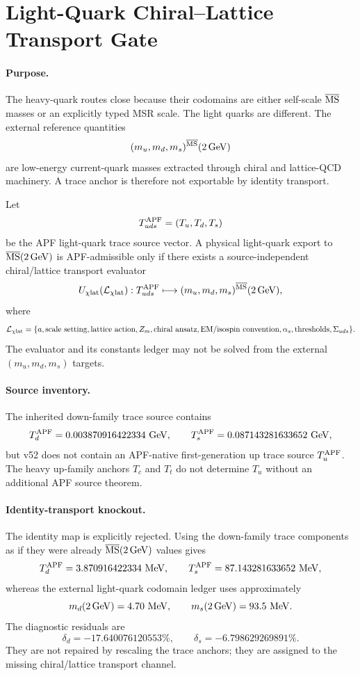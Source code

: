 \section{Light-Quark Chiral--Lattice Transport Gate}
\label{sec:light-quark-chiral-lattice-v52}

\paragraph{Purpose.}
The heavy-quark routes close because their codomains are either self-scale
$\overline{\rm MS}$ masses or an explicitly typed MSR scale.  The light quarks
are different.  The external reference quantities
\[
(m_u,m_d,m_s)^{\overline{\rm MS}}(2\,{\rm GeV})
\]
are low-energy current-quark masses extracted through chiral and lattice-QCD
machinery.  A trace anchor is therefore not exportable by identity transport.

\begin{theorem}
Let
\[
T_{uds}^{\rm APF}=(T_u,T_d,T_s)
\]
be the APF light-quark trace source vector.  A physical light-quark export to
$\overline{\rm MS}(2\,{\rm GeV})$ is APF-admissible only if there exists a
source-independent chiral/lattice transport evaluator
\[
U_{\chi{\rm lat}}(\mathcal L_{\chi{\rm lat}}):
T_{uds}^{\rm APF}\longmapsto
(m_u,m_d,m_s)^{\overline{\rm MS}}(2\,{\rm GeV}),
\]
where
\[
\mathcal L_{\chi{\rm lat}}=
\{a,\text{scale setting},\text{lattice action},Z_m,
\text{chiral ansatz},\text{EM/isospin convention},
\alpha_s,\text{thresholds},\Sigma_{uds}\}.
\]
The evaluator and its constants ledger may not be solved from the external
$(m_u,m_d,m_s)$ targets.
\end{theorem}

\paragraph{Source inventory.}
The inherited down-family trace source contains
\[
T_d^{\rm APF}=0.003870916422334\ {\rm GeV},\qquad
T_s^{\rm APF}=0.087143281633652\ {\rm GeV},
\]
but v52 does not contain an APF-native first-generation up trace source
$T_u^{\rm APF}$.  The heavy up-family anchors $T_c$ and $T_t$ do not determine
$T_u$ without an additional APF source theorem.

\paragraph{Identity-transport knockout.}
The identity map is explicitly rejected.  Using the down-family trace components
as if they were already $\overline{\rm MS}(2\,{\rm GeV})$ values gives
\[
T_d^{\rm APF}=3.870916422334\ {\rm MeV},\qquad
T_s^{\rm APF}=87.143281633652\ {\rm MeV},
\]
whereas the external light-quark codomain ledger uses approximately
\[
m_d(2\,{\rm GeV})=4.70\ {\rm MeV},\qquad
m_s(2\,{\rm GeV})=93.5\ {\rm MeV}.
\]
The diagnostic residuals are
\[
\delta_d=-17.640076120553\%,\qquad
\delta_s=-6.798629269891\%.
\]
They are not repaired by rescaling the trace anchors; they are assigned to the
missing chiral/lattice transport channel.

